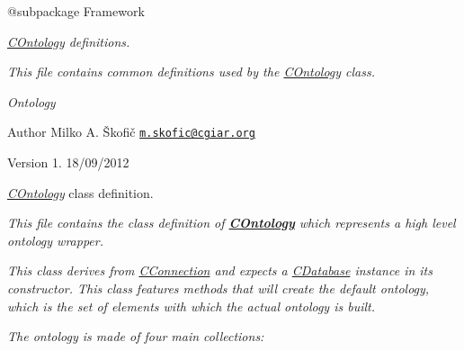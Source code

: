 {\itshape \begin{DoxyVerb} @subpackage        Framework\end{DoxyVerb}
}

{\itshape \hyperlink{class_c_ontology}{C\-Ontology} definitions.}

{\itshape This file contains common definitions used by the \hyperlink{class_c_ontology}{C\-Ontology} class.}

{\itshape  Ontology}

{\itshape \begin{DoxyAuthor}{Author}
Milko A. Škofič \href{mailto:m.skofic@cgiar.org}{\tt m.\-skofic@cgiar.\-org} 
\end{DoxyAuthor}
\begin{DoxyVersion}{Version}
1. 18/09/2012
\end{DoxyVersion}
{\itshape \hyperlink{class_c_ontology}{C\-Ontology}} class definition.}

{\itshape This file contains the class definition of {\bfseries \hyperlink{class_c_ontology}{C\-Ontology}} which represents a high level ontology wrapper.}

{\itshape This class derives from \hyperlink{class_c_connection}{C\-Connection} and expects a \hyperlink{class_c_database}{C\-Database} instance in its constructor. This class features methods that will create the default ontology, which is the set of elements with which the actual ontology is built.}

{\itshape The ontology is made of four main collections\-:}

